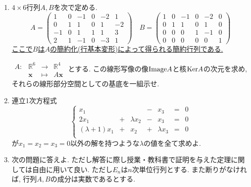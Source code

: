\documentclass[dvipdfmx,a4paper,11pt]{article}
\newcommand{\R}{\mathbb{R}}
\theoremstyle{definition}
\begin{document}
\begin{enumerate}[label={\Large \textbf{第}\arabic*\textbf{問}.}]
 
 
 \item $4 \times 6$行列$A, B$を次で定める. 
 $$
A =
\begin{pmatrix}
1 & 0 & -1 & 0 & -2 & 1 \\
0 & 1 & 1  & 0 & 1  & -2 \\
-1 & 0 & 1 & 1 & 1  & 3 \\
2 & 1 & -1 & 0 & -3 & 1
\end{pmatrix}
\quad  
  B=
\begin{pmatrix}
1 & 0 & -1 & 0 & -2 & 0 \\
0 & 1 & 1  & 0 & 1  & 0 \\
0 & 0 & 0  & 1 & -1 & 0 \\
0 & 0 & 0  & 0 & 0  & 1
\end{pmatrix}
$$
\underline{ここで$B$は$A$の簡約化(行基本変形)によって得られる簡約行列である.}

$
 \begin{array}{cccc}
A:&  \R^6&\rightarrow& \R^4 \\
& \bm{x}&\longmapsto & A\bm{x}
\end{array}
$
とする. この線形写像の像${\rm Image}A$と核${\rm Ker}A$の次元を求め, それらの線形部分空間としての基底を一組示せ. 

 

\item  連立1次方程式
 $$
 \left\{ 
\begin{matrix}
x_1&  &  &  -& x_3&= & 0\\
2x_1&+&\lambda x_2& -&x_3&= & 0\\
(\lambda + 1)x_1& +&x_2& + &\lambda x_3&=&0\\
\end{matrix}
\right.
 $$
 が$x_1=x_2=x_3=0$以外の解を持つような$\lambda$の値を全て求めよ.

\item
 
次の問題に答えよ. ただし解答に際し授業・教科書で証明を与えた定理に関しては自由に用いて良い. 
ただし$E_n$は$n$次単位行列とする. 
また断りがなければ, 行列$A, B$の成分は実数であるとする. 


\end{enumerate}
\end{document}
